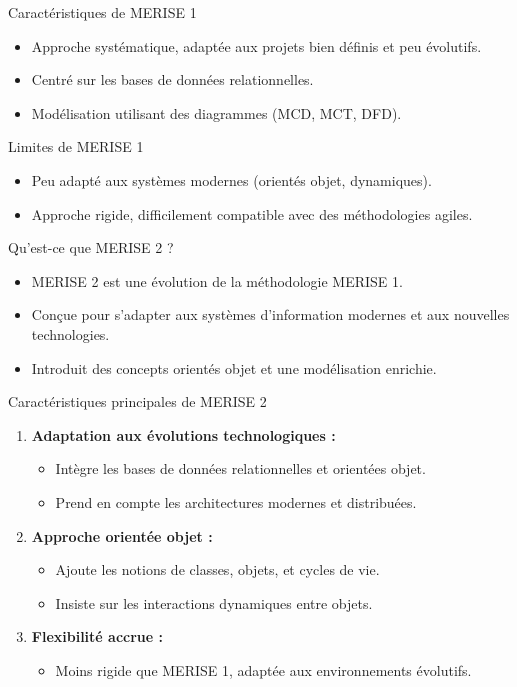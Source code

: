 \documentclass{beamer}
\begin{document}
\begin{frame}{Caractéristiques de MERISE 1}
\begin{itemize}
    \item Approche systématique, adaptée aux projets bien définis et peu évolutifs.
    \item Centré sur les bases de données relationnelles.
    \item Modélisation utilisant des diagrammes (MCD, MCT, DFD).
\end{itemize}
\end{frame}

\begin{frame}{Limites de MERISE 1}
\begin{itemize}
    \item Peu adapté aux systèmes modernes (orientés objet, dynamiques).
    \item Approche rigide, difficilement compatible avec des méthodologies agiles.
\end{itemize}
\end{frame}

\begin{frame}{Qu'est-ce que MERISE 2 ?}
\begin{itemize}
    \item MERISE 2 est une évolution de la méthodologie MERISE 1.
    \item Conçue pour s'adapter aux systèmes d'information modernes et aux nouvelles technologies.
    \item Introduit des concepts orientés objet et une modélisation enrichie.
\end{itemize}
\end{frame}

\begin{frame}{Caractéristiques principales de MERISE 2}
\begin{enumerate}
    \item \textbf{Adaptation aux évolutions technologiques :}
    \begin{itemize}
        \item Intègre les bases de données relationnelles et orientées objet.
        \item Prend en compte les architectures modernes et distribuées.
    \end{itemize}
    \item \textbf{Approche orientée objet :}
    \begin{itemize}
        \item Ajoute les notions de classes, objets, et cycles de vie.
        \item Insiste sur les interactions dynamiques entre objets.
    \end{itemize}
    \item \textbf{Flexibilité accrue :}
    \begin{itemize}
        \item Moins rigide que MERISE 1, adaptée aux environnements évolutifs.
    \end{itemize}
\end{enumerate}
\end{frame}
\end{document}
